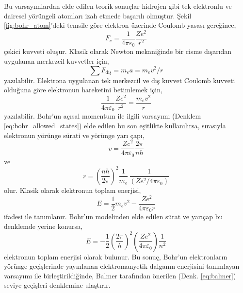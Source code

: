 \documentclass[00_kitap.tex]{subfiles}
\begin{document}
Bu varsayımlardan elde edilen teorik sonuçlar hidrojen gibi tek elektronlu ve dairesel yörüngeli atomları izah etmede başarılı olmuştur. Şekil \ref{fig:bohr_atom}'deki temsile göre elektron üzerinde Coulomb yasası gereğince,
\begin{equation}
F_e = \frac{1}{4\pi\varepsilon_0} \frac{Ze^2}{r^2}
\label{eq:bohr_elektron}
\end{equation}
çekici kuvveti oluşur. Klasik olarak Newton mekaniğinde bir cisme dışarıdan uygulanan merkezcil kuvvetler için,
\begin{equation}
\sum F_\text{dış} = m_e a = m_e v^2/r
\label{eq:newton_ma}
\end{equation}
yazılabilir. Elektrona uygulanan tek merkezcil ve dış kuvvet Coulomb kuvveti olduğuna göre elektronun hareketini betimlemek için,
\begin{equation}
\frac{1}{4\pi\varepsilon_0} \frac{Ze^2}{r^2} = \frac{m_e v^2}{r} 
\label{eq:bohr_orbit_motion}
\end{equation}
yazılabilir. Bohr'un açısal momentum ile ilgili varsayımı (Denklem \ref{eq:bohr_allowed_states}) elde edilen bu son eşitlikte kullanılırsa, sırasıyla elektronun yörünge sürati ve yörünge yarı çapı,
\begin{equation}
v = \frac{Ze^2}{4\pi\varepsilon_0}  \frac{2\pi}{n h}
\label{eq:bohr_elektron_speed}
\end{equation}
ve
\begin{equation}
r = \left(\frac{n h}{2 \pi} \right)^2 \frac{1}{m_e}\, \frac{1}{(Z e^2/4\pi\varepsilon_0)}
\label{eq:bohr_elektron_radius}
\end{equation}
olur. Klasik olarak elektronun toplam enerjisi,
\begin{equation}
E = \frac{1}{2}m_e v^2 - \frac{Z e^2}{4\pi\varepsilon_0 r}
\label{eq:bohr_elektron_energy1}
\end{equation}
ifadesi ile tanımlanır. Bohr'un modelinden elde edilen sürat ve yarıçap bu denklemde yerine konursa,
\begin{equation}
E = -\frac{1}{2} \left(\frac{2\pi}{h} \right)^2 \left(\frac{Ze^2}{4\pi \varepsilon_0} \right) \frac{1}{n^2}
\label{eq:bohr_elektron_energy2}
\end{equation}
elektronun toplam enerjisi olarak bulunur. Bu sonuç, Bohr'un elektronların yörünge geçişlerinde yayınlanan elektromanyetik dalganın enerjisini tanımlayan varsayımı ile birleştirildiğinde, Balmer tarafından önerilen (Denk. \ref{eq:balmer}) seviye geçişleri denklemine ulaştırır.
\end{document}

